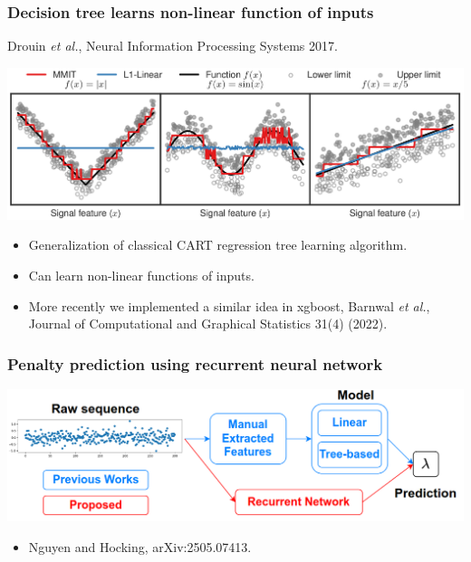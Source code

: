 \documentclass{beamer}
\begin{document}
\begin{frame}
  \frametitle{Decision tree learns non-linear function of inputs}
  
  Drouin \emph{et al.}, Neural Information Processing Systems 2017.

  \includegraphics[width=\linewidth]{mmit-functions}
  \begin{itemize}
  \item Generalization of classical CART regression tree learning algorithm.
  \item Can learn non-linear functions of inputs.
  \item More recently we implemented a similar idea in xgboost,
    Barnwal \emph{et al.}, Journal of Computational and Graphical Statistics 31(4) (2022).
  \end{itemize}
\end{frame}

\begin{frame}
  \frametitle{Penalty prediction using recurrent neural network}
  
  \includegraphics[width=\linewidth]{penalty-pred-RNN}
  \begin{itemize}
  \item Nguyen and Hocking, arXiv:2505.07413.
  \end{itemize}
\end{frame}
\end{document}
